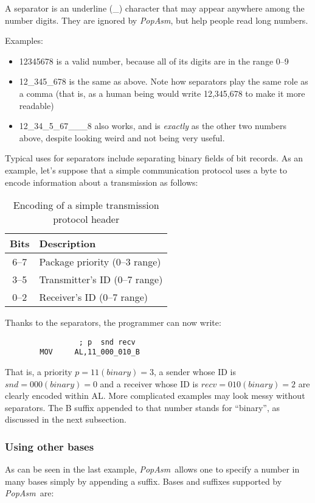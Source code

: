 \documentclass[a4paper,12pt]{book}
\newcommand{\popasm}{\emph{PopAsm}}
\begin{document}
A separator is an underline (\_) character that may appear anywhere
among
the number digits. They are ignored by \popasm, but help people read
long
numbers.

Examples:

\begin{itemize}
\item{12345678} is a valid number, because all of its digits are in the
range 0--9
\item{12\_345\_678} is the same as above. Note how separators play the
same role
as a comma (that is, as a human being would write 12,345,678 to make
it more readable)
\item{12\_34\_5\_67\_\_\_8} also works, and is \emph{exactly} as the
other two
numbers above, despite looking weird and not being very useful.
\end{itemize}

Typical uses for separators include separating binary fields of bit
records. As an example, let's suppose that a simple communication
protocol uses a byte to encode information about a transmission as
follows:

\begin{table}[h]
\begin{center}
\begin{tabular}[h]{cl}
Bits & Description\\
\hline
6--7 & Package priority (0--3 range)\\
3--5 & Transmitter's ID (0--7 range)\\
0--2 & Receiver's ID (0--7 range)\\
\hline
\end{tabular}
\caption{Encoding of a simple transmission protocol header}
\end{center}
\end{table}
Thanks to the separators, the programmer can now write:

\begin{verbatim}
                 ; p  snd recv
        MOV     AL,11_000_010_B
\end{verbatim}

That is, a priority $p = 11 (binary) = 3$, a sender whose ID is $snd
= 000 (binary) = 0$ and a receiver whose ID is $recv = 010 (binary)
= 2$ are clearly encoded within AL. More complicated examples may
look messy without separators. The B suffix appended to that
number stands for ``binary'', as discussed in the next subsection.

\subsubsection{Using other bases}
As can be seen in the last example, \popasm\ allows one to specify a
number in many bases
simply by appending a suffix. Bases and suffixes supported by \popasm\
are:
\end{document}
